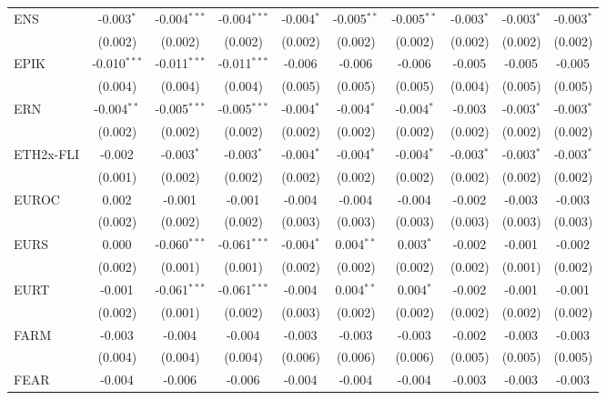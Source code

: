 \begin{table}[!htbp]
\begin{tabular}{@{\extracolsep{5pt}}lccccccccc}
 ENS & -0.003$^{*}$ & -0.004$^{***}$ & -0.004$^{***}$ & -0.004$^{*}$ & -0.005$^{**}$ & -0.005$^{**}$ & -0.003$^{*}$ & -0.003$^{*}$ & -0.003$^{*}$ \\
  & (0.002) & (0.002) & (0.002) & (0.002) & (0.002) & (0.002) & (0.002) & (0.002) & (0.002) \\
 EPIK & -0.010$^{***}$ & -0.011$^{***}$ & -0.011$^{***}$ & -0.006$^{}$ & -0.006$^{}$ & -0.006$^{}$ & -0.005$^{}$ & -0.005$^{}$ & -0.005$^{}$ \\
  & (0.004) & (0.004) & (0.004) & (0.005) & (0.005) & (0.005) & (0.004) & (0.005) & (0.005) \\
 ERN & -0.004$^{**}$ & -0.005$^{***}$ & -0.005$^{***}$ & -0.004$^{*}$ & -0.004$^{*}$ & -0.004$^{*}$ & -0.003$^{}$ & -0.003$^{*}$ & -0.003$^{*}$ \\
  & (0.002) & (0.002) & (0.002) & (0.002) & (0.002) & (0.002) & (0.002) & (0.002) & (0.002) \\
 ETH2x-FLI & -0.002$^{}$ & -0.003$^{*}$ & -0.003$^{*}$ & -0.004$^{*}$ & -0.004$^{*}$ & -0.004$^{*}$ & -0.003$^{*}$ & -0.003$^{*}$ & -0.003$^{*}$ \\
  & (0.001) & (0.002) & (0.002) & (0.002) & (0.002) & (0.002) & (0.002) & (0.002) & (0.002) \\
 EUROC & 0.002$^{}$ & -0.001$^{}$ & -0.001$^{}$ & -0.004$^{}$ & -0.004$^{}$ & -0.004$^{}$ & -0.002$^{}$ & -0.003$^{}$ & -0.003$^{}$ \\
  & (0.002) & (0.002) & (0.002) & (0.003) & (0.003) & (0.003) & (0.003) & (0.003) & (0.003) \\
 EURS & 0.000$^{}$ & -0.060$^{***}$ & -0.061$^{***}$ & -0.004$^{*}$ & 0.004$^{**}$ & 0.003$^{*}$ & -0.002$^{}$ & -0.001$^{}$ & -0.002$^{}$ \\
  & (0.002) & (0.001) & (0.001) & (0.002) & (0.002) & (0.002) & (0.002) & (0.001) & (0.002) \\
 EURT & -0.001$^{}$ & -0.061$^{***}$ & -0.061$^{***}$ & -0.004$^{}$ & 0.004$^{**}$ & 0.004$^{*}$ & -0.002$^{}$ & -0.001$^{}$ & -0.001$^{}$ \\
  & (0.002) & (0.001) & (0.002) & (0.003) & (0.002) & (0.002) & (0.002) & (0.002) & (0.002) \\
 FARM & -0.003$^{}$ & -0.004$^{}$ & -0.004$^{}$ & -0.003$^{}$ & -0.003$^{}$ & -0.003$^{}$ & -0.002$^{}$ & -0.003$^{}$ & -0.003$^{}$ \\
  & (0.004) & (0.004) & (0.004) & (0.006) & (0.006) & (0.006) & (0.005) & (0.005) & (0.005) \\
 FEAR & -0.004$^{}$ & -0.006$^{}$ & -0.006$^{}$ & -0.004$^{}$ & -0.004$^{}$ & -0.004$^{}$ & -0.003$^{}$ & -0.003$^{}$ & -0.003$^{}$ \\

\end{tabular}
\end{table}
